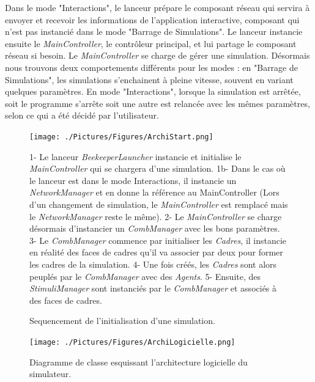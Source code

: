 			 Dans le mode "Interactions", le lanceur prépare le composant réseau qui servira à envoyer et recevoir les informations de l'application interactive, composant qui n'est pas instancié dans le mode "Barrage de Simulations". Le lanceur instancie ensuite le \textit{MainController}, le contrôleur principal, et lui partage le composant réseau si besoin. Le \textit{MainController} se charge de gérer une simulation. Désormais nous trouvons deux comportements différents pour les modes : en "Barrage de Simulations", les simulations s'enchainent à pleine vitesse, souvent en variant quelques paramètres. En mode "Interactions", lorsque la simulation est arrêtée, soit le programme s'arrête soit une autre est relancée avec les mêmes paramètres, selon ce qui a été décidé par l'utilisateur.
			 
			\begin{figure}
			\centering
			\texttt{[image: ./Pictures/Figures/ArchiStart.png]}
			\caption{Sequencement de l'initialisation d'une simulation.}{1- Le lanceur \textit{BeekeeperLauncher} instancie et initialise le \textit{MainController} qui se chargera d'une simulation. 1b- Dans le cas où le lanceur est dans le mode Interactions, il instancie un \textit{NetworkManager} et en donne la référence au MainController (Lors d'un changement de simulation, le \textit{MainController} est remplacé mais le \textit{NetworkManager} reste le même). 2- Le \textit{MainController} se charge désormais d'instancier un \textit{CombManager} avec les bons paramètres. 3- Le \textit{CombManager} commence par initialiser les \textit{Cadres}, il instancie en réalité des faces de cadres qu'il va associer par deux pour former les cadres de la simulation. 4- Une fois créés, les \textit{Cadres} sont alors peuplés par le \textit{CombManager} avec des \textit{Agents}. 5- Ensuite, des \textit{StimuliManager} sont instanciés par le \textit{CombManager} et associés à des faces de cadres.}
			\label{ArchiStart}
			\end{figure}
			
			\begin{figure}
			\centering
			\texttt{[image: ./Pictures/Figures/ArchiLogicielle.png]}
			\caption{Diagramme de classe esquissant l'architecture logicielle du simulateur.}
			\label{ArchiLogicielle}
			\end{figure}
			
